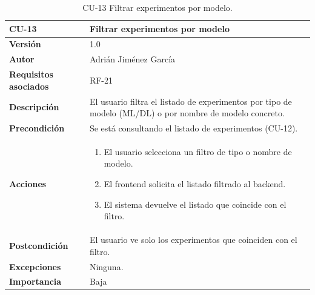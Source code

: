 \begin{table}[p]
	\centering
	\begin{tabularx}{\linewidth}{ p{} X }
		\toprule
		\textbf{CU-13}    & \textbf{Filtrar experimentos por modelo}\\
		\toprule
		\textbf{Versión}              & 1.0 \\
		\textbf{Autor}                & Adrián Jiménez García \\
		\textbf{Requisitos asociados} & RF-21 \\
		\textbf{Descripción}          & El usuario filtra el listado de experimentos por tipo de modelo (ML/DL) o por nombre de modelo concreto. \\
		\textbf{Precondición}         & Se está consultando el listado de experimentos (CU-12). \\
		\textbf{Acciones}             &
		\begin{enumerate}
			\def\labelenumi{\arabic{enumi}.}
			\tightlist
			\item El usuario selecciona un filtro de tipo o nombre de modelo.
			\item El frontend solicita el listado filtrado al backend.
			\item El sistema devuelve el listado que coincide con el filtro.
		\end{enumerate}\\
		\textbf{Postcondición}        & El usuario ve solo los experimentos que coinciden con el filtro. \\
		\textbf{Excepciones}          & Ninguna. \\
		\textbf{Importancia}          & Baja \\
		\bottomrule
	\end{tabularx}
	\caption{CU-13 Filtrar experimentos por modelo.}
\end{table}

